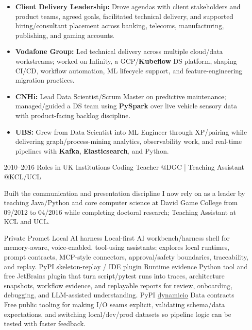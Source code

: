 \documentclass[]{../../../../friggeri-cv}
\begin{document}
\begin{entrylist}
{{        }
        \begin{itemize}[leftmargin=1.1em]
            \item \footnotesize\textbf{Client Delivery Leadership:} Drove agendas with client stakeholders and product teams, agreed goals, facilitated technical delivery, and supported hiring/consultant placement across banking, telecoms, manufacturing, publishing, and gaming accounts.
            \item \footnotesize\textbf{Vodafone Group:} Led technical delivery across multiple cloud/data workstreams; worked on Infinity, a GCP/\textbf{Kubeflow} DS platform, shaping CI/CD, workflow automation, ML lifecycle support, and feature-engineering migration practices.
            \item \footnotesize\textbf{CNHi:} Lead Data Scientist/Scrum Master on predictive maintenance; managed/guided a DS team using \textbf{PySpark} over live vehicle sensory data with product-facing backlog discipline.
            \item \footnotesize\textbf{UBS:} Grew from Data Scientist into ML Engineer through XP/pairing while delivering graph/process-mining analytics, observability work, and real-time pipelines with \textbf{Kafka}, \textbf{Elasticsearch}, and Python.
        \end{itemize}
    }
    \entry
    {2010--2016}
    {Roles in UK Institutions}
    {\small Coding Teacher @DGC | Teaching Assistant @KCL/UCL}
    {
        {\small
        \setlength{\parindent}{0pt}
        \setlength{\leftskip}{0pt}
        Built the communication and presentation discipline I now rely on as a leader by teaching Java/Python and core computer science at David Game College from 09/2012 to 04/2016 while completing doctoral research; Teaching Assistant at KCL and UCL.

        }
    }
\end{entrylist}
\newpage
\setlength{\parskip}{2pt}
\setlength{\parsep}{0pt}
\begin{entrylist2}
    \entrytwo
        {\small Private}
        {\small Promet}
        {\small Local AI harness}
        {\footnotesize Local-first AI workbench/harness shell for memory-aware, voice-enabled, tool-using assistants; explores local runtimes, prompt contracts, MCP-style connectors, approval/safety boundaries, traceability, and replay.}
    \entrytwo
        {\small PyPI}
        {\small \href{https://pypi.org/project/skeleton-replay/}{skeleton-replay} / \href{https://plugins.jetbrains.com/plugin/32807-skeleton-replay}{IDE plugin}}
        {\small Runtime evidence}
        {\footnotesize Python tool and free JetBrains plugin that turn script/pytest runs into traces, architecture snapshots, workflow evidence, and replayable reports for review, onboarding, debugging, and LLM-assisted understanding.}
    \entrytwo
        {\small PyPI}
        {\small \href{https://pypi.org/project/dynamicio/}{dynamicio}}
        {\small Data contracts}
        {\footnotesize Free public tooling for making I/O seams explicit, validating schema/data expectations, and switching local/dev/prod datasets so pipeline logic can be tested with faster feedback.}
\end{entrylist2}
\end{document}
